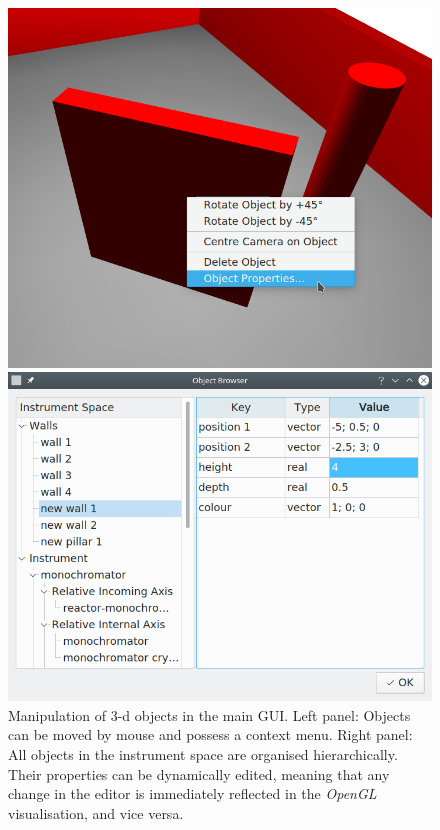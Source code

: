 \begin{figure}[htb]
	\begin{minipage}{0.45 \textwidth}
		\begin{center}
			\includegraphics[width = 1 \textwidth]{figures/gui_object}
		\end{center}
	\end{minipage}
	\hspace{0.1cm}
	\begin{minipage}{0.5 \textwidth}
		\begin{center}
			\includegraphics[width = 1 \textwidth]{figures/gui_objbrowser}
		\end{center}
	\end{minipage}
	\caption[Object manipulation.]{Manipulation of 3-d objects in the main GUI.
		Left panel: Objects can be moved by mouse and possess a context menu.
		Right panel: All objects in the instrument space are organised hierarchically. 
			Their properties can be dynamically edited, meaning that any change
			in the editor is immediately reflected in the \textit{OpenGL}
			visualisation, and vice versa.
		\label{fig:gui_objects}}
\end{figure}



